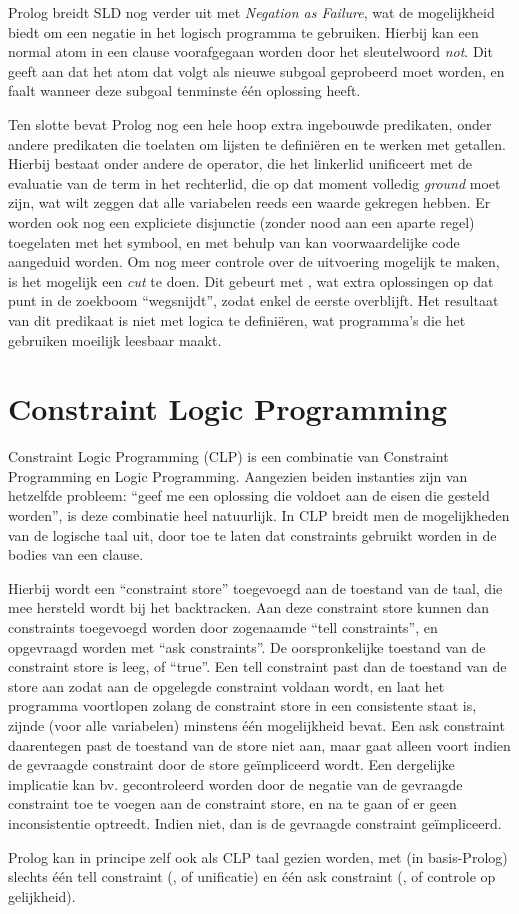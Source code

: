 Prolog breidt SLD nog verder uit met {\em Negation as Failure}, wat de mogelijkheid biedt om een negatie in het logisch programma te gebruiken. Hierbij kan een normal atom in een clause voorafgegaan worden door het sleutelwoord {\em not}. Dit geeft aan dat het atom dat volgt als nieuwe subgoal geprobeerd moet worden, en faalt wanneer deze subgoal tenminste \'e\'en oplossing heeft.

Ten slotte bevat Prolog nog een hele hoop extra ingebouwde predikaten, onder andere predikaten die toelaten om lijsten te defini\"eren en te werken met getallen. Hierbij bestaat onder andere de  operator, die het linkerlid unificeert met de evaluatie van de term in het rechterlid, die op dat moment volledig {\em ground} moet zijn, wat wilt zeggen dat alle variabelen reeds een waarde gekregen hebben. Er worden ook nog een expliciete disjunctie (zonder nood aan een aparte regel) toegelaten met het \code{;} symbool, en met behulp van \code{->} kan voorwaardelijke code aangeduid worden. Om nog meer controle over de uitvoering mogelijk te maken, is het mogelijk een {\em cut} te doen. Dit gebeurt met \code{!}, wat extra oplossingen op dat punt in de zoekboom ``wegsnijdt'', zodat enkel de eerste overblijft. Het resultaat van dit predikaat is niet met logica te defini\"eren, wat programma's die het gebruiken moeilijk leesbaar maakt.

\section{Constraint Logic Programming}

Constraint Logic Programming (CLP) is een combinatie van Constraint Programming en Logic Programming. Aangezien beiden instanties zijn van hetzelfde probleem: ``geef me een oplossing die voldoet aan de eisen die gesteld worden'', is deze combinatie heel natuurlijk. In CLP breidt men de mogelijkheden van de logische taal uit, door toe te laten dat constraints gebruikt worden in de bodies van een clause. 

Hierbij wordt een ``constraint store'' toegevoegd aan de toestand van de taal, die mee hersteld wordt bij het backtracken. Aan deze constraint store kunnen dan constraints toegevoegd worden door zogenaamde ``tell constraints'', en opgevraagd worden met ``ask constraints''. De oorspronkelijke toestand van de constraint store is leeg, of ``true''. Een tell constraint past dan de toestand van de store aan zodat aan de opgelegde constraint voldaan wordt, en laat het programma voortlopen zolang de constraint store in een consistente staat is, zijnde (voor alle variabelen) minstens \'e\'en mogelijkheid bevat. Een ask constraint daarentegen past de toestand van de store niet aan, maar gaat alleen voort indien de gevraagde constraint door de store ge\"impliceerd wordt. Een dergelijke implicatie kan bv. gecontroleerd worden door de negatie van de gevraagde constraint toe te voegen aan de constraint store, en na te gaan of er geen inconsistentie optreedt. Indien niet, dan is de gevraagde constraint ge\"impliceerd.

Prolog kan in principe zelf ook als CLP taal gezien worden, met (in basis-Prolog) slechts \'e\'en tell constraint (\code{=}, of unificatie) en \'e\'en ask constraint (\code{==}, of controle op gelijkheid).

